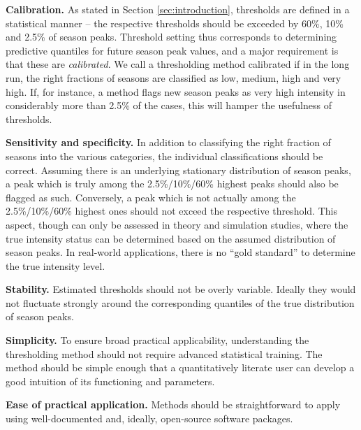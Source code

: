 \documentclass[12pt]{article}
\begin{document}
\begin{description}
\item \textbf{Calibration.} As stated in Section \ref{sec:introduction}, thresholds are defined in a statistical manner -- the respective thresholds should be exceeded by 60\%, 10\% and 2.5\% of season peaks. Threshold setting thus corresponds to determining predictive quantiles for future season peak values, and a major requirement is that these are \textit{calibrated}. We call a thresholding method calibrated if in the long run, the right fractions of seasons are classified as low, medium, high and very high. If, for instance, a method flags new season peaks as very high intensity in considerably more than 2.5\% of the cases, this will hamper the usefulness of thresholds.
\item \textbf{Sensitivity and specificity.} In addition to classifying the right fraction of seasons into the various categories, the individual classifications should be correct. Assuming there is an underlying stationary distribution of season peaks, a peak which is truly among the 2.5\%/10\%/60\% highest peaks should also be flagged as such. Conversely, a peak which is not actually among the 2.5\%/10\%/60\% highest ones should not exceed the respective threshold. This aspect, though can only be assessed in theory and simulation studies, where the true intensity status can be determined based on the assumed distribution of season peaks. In real-world applications, there is no ``gold standard'' to determine the true intensity level. %
\item \textbf{Stability.} Estimated thresholds should not be overly variable. Ideally they would not fluctuate strongly around the corresponding quantiles of the true distribution of season peaks.
\item \textbf{Simplicity.} To ensure broad practical applicability, understanding the thresholding method should not require advanced statistical training. The method should be simple enough that a quantitatively literate user can develop a good intuition of its functioning and parameters.
\item \textbf{Ease of practical application.} Methods should be straightforward to apply using well-documented and, ideally, open-source software packages.
\end{description}
\end{document}

